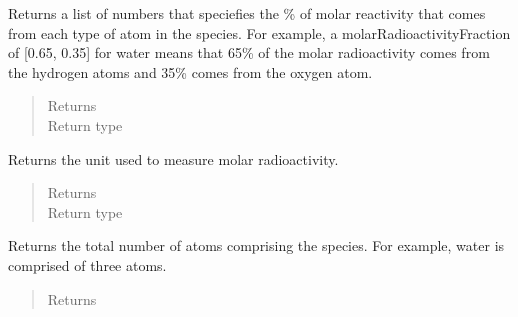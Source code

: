 \documentclass[letterpaper,10pt,openany,oneside,english]{sphinxmanual}
\begin{document}
\begin{fulllineitems}

\begin{fulllineitems}
\label{\detokenize{support_rst/specie:specie.Specie.GetMolarRadioactivityFractions}}
Returns a list of numbers that speciefies the \% of molar reactivity
that comes from each type of atom in the species. For example, a
molarRadioactivityFraction of {[}0.65, 0.35{]} for water means that 65\%
of the molar radioactivity comes from the hydrogen atoms and 35\% comes
from the oxygen atom.
\begin{quote}\begin{description}
\item[{Returns}] \leavevmode
{}

\item[{Return type}] \leavevmode
{}

\end{description}\end{quote}

\end{fulllineitems}


\begin{fulllineitems}
\label{\detokenize{support_rst/specie:specie.Specie.GetMolarRadioactivityUnit}}
Returns the unit used to measure molar radioactivity.
\begin{quote}\begin{description}
\item[{Returns}] \leavevmode
{}

\item[{Return type}] \leavevmode
{}

\end{description}\end{quote}

\end{fulllineitems}


\begin{fulllineitems}
\label{\detokenize{support_rst/specie:specie.Specie.GetNAtoms}}
Returns the total number of atoms comprising the species. For example,
water is comprised of three atoms.
\begin{quote}\begin{description}
\item[{Returns}] \leavevmode
{}


\end{description}
\end{quote}
\end{fulllineitems}
\end{fulllineitems}
\end{document}
